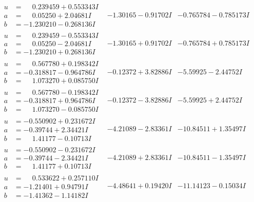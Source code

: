\documentclass[1p]{elsarticle_modified}
\theoremstyle{definition}
\begin{document}
$$\begin{array}{c|c|c}
\begin{aligned}
u &= \phantom{-}0.239459 + 0.553343 I \\
a &= \phantom{-}0.05250 + 2.04681 I \\
b &= -1.230210 - 0.268136 I\end{aligned}
 & -1.30165 - 0.91702 I & -0.765784 - 0.785173 I \\ \hline\begin{aligned}
u &= \phantom{-}0.239459 - 0.553343 I \\
a &= \phantom{-}0.05250 - 2.04681 I \\
b &= -1.230210 + 0.268136 I\end{aligned}
 & -1.30165 + 0.91702 I & -0.765784 + 0.785173 I \\ \hline\begin{aligned}
u &= \phantom{-}0.567780 + 0.198342 I \\
a &= -0.318817 - 0.964786 I \\
b &= \phantom{-}1.073270 + 0.085750 I\end{aligned}
 & -0.12372 + 3.82886 I & -5.59925 - 2.44752 I \\ \hline\begin{aligned}
u &= \phantom{-}0.567780 - 0.198342 I \\
a &= -0.318817 + 0.964786 I \\
b &= \phantom{-}1.073270 - 0.085750 I\end{aligned}
 & -0.12372 - 3.82886 I & -5.59925 + 2.44752 I \\ \hline\begin{aligned}
u &= -0.550902 + 0.231672 I \\
a &= -0.39744 + 2.34421 I \\
b &= \phantom{-}1.41177 - 0.10713 I\end{aligned}
 & -4.21089 - 2.83361 I & -10.84511 + 1.35497 I \\ \hline\begin{aligned}
u &= -0.550902 - 0.231672 I \\
a &= -0.39744 - 2.34421 I \\
b &= \phantom{-}1.41177 + 0.10713 I\end{aligned}
 & -4.21089 + 2.83361 I & -10.84511 - 1.35497 I \\ \hline\begin{aligned}
u &= \phantom{-}0.533622 + 0.257110 I \\
a &= -1.21401 + 0.94791 I \\
b &= -1.41362 - 1.14182 I\end{aligned}
 & -4.48641 + 0.19420 I & -11.14123 - 0.15034 I \\ \hline\begin{aligned}

\end{aligned}
\end{array}$$
\end{document}
